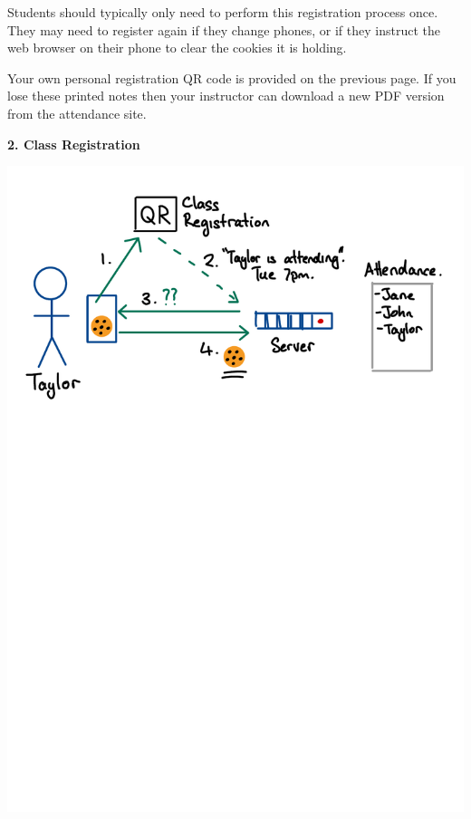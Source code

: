 \begin{minipage}[t]{\dimexpr0.5\linewidth-1em}
Students should typically only need to perform this registration process once.
They may need to register again if they change phones, or if they instruct the
web browser on their phone to clear the cookies it is holding.

Your own personal registration QR code is provided on the previous page.
If you lose these printed notes then your instructor can download a new PDF version
from the attendance site.
\end{minipage}
\hspace{2em}
\begin{minipage}[t]{\dimexpr0.5\linewidth-1em}
\vspace{2em}
\textbf{2. Class Registration}
\begin{center}
\includegraphics[scale=0.4]{figure/fig-class-registration.pdf}


\end{center}
\end{minipage}
